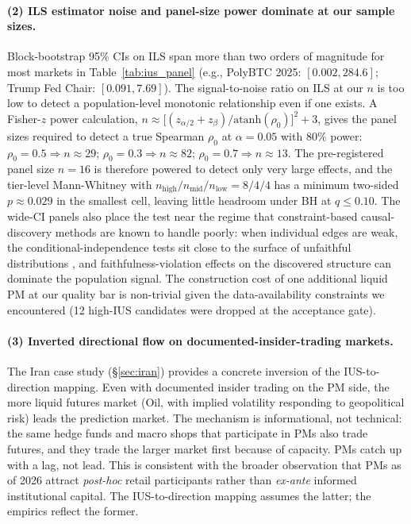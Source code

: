 \documentclass{article}
\begin{document}
\paragraph{(2) ILS estimator noise and panel-size power dominate at our sample sizes.}
Block-bootstrap 95\% CIs on ILS span more than two orders of magnitude for most markets in Table~\ref{tab:ius_panel} (e.g., PolyBTC 2025: $[0.002, 284.6]$; Trump Fed Chair: $[0.091, 7.69]$). The signal-to-noise ratio on ILS at our $n$ is too low to detect a population-level monotonic relationship even if one exists. A Fisher-$z$ power calculation, $n \approx \big[(z_{\alpha/2} + z_\beta)/\mathrm{atanh}(\rho_0)\big]^2 + 3$, gives the panel sizes required to detect a true Spearman $\rho_0$ at $\alpha = 0.05$ with 80\% power: $\rho_0 = 0.5 \Rightarrow n \approx 29$; $\rho_0 = 0.3 \Rightarrow n \approx 82$; $\rho_0 = 0.7 \Rightarrow n \approx 13$. The pre-registered panel size $n = 16$ is therefore powered to detect only very large effects, and the tier-level Mann-Whitney with $n_\text{high}/n_\text{mid}/n_\text{low} = 8/4/4$ has a minimum two-sided $p \approx 0.029$ in the smallest cell, leaving little headroom under BH at $q \le 0.10$. The wide-CI panels also place the test near the regime that constraint-based causal-discovery methods are known to handle poorly: when individual edges are weak, the conditional-independence tests sit close to the surface of unfaithful distributions \citep{robins2003surface}, and faithfulness-violation effects on the discovered structure can dominate the population signal. The construction cost of one additional liquid PM at our quality bar is non-trivial given the data-availability constraints we encountered (12 high-IUS candidates were dropped at the acceptance gate).

\paragraph{(3) Inverted directional flow on documented-insider-trading markets.}
The Iran case study (\S\ref{sec:iran}) provides a concrete inversion of the IUS-to-direction mapping. Even with documented insider trading on the PM side, the more liquid futures market (Oil, with implied volatility responding to geopolitical risk) leads the prediction market. The mechanism is informational, not technical: the same hedge funds and macro shops that participate in PMs also trade futures, and they trade the larger market first because of capacity. PMs catch up with a lag, not lead. This is consistent with the broader observation that PMs as of 2026 attract \emph{post-hoc} retail participants rather than \emph{ex-ante} informed institutional capital. The IUS-to-direction mapping assumes the latter; the empirics reflect the former.
\end{document}
